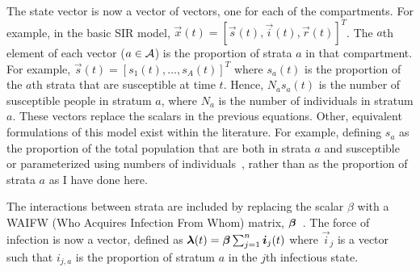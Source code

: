\documentclass[thesis.tex]{subfiles}
\begin{document}
The state vector is now a vector of vectors, one for each of the compartments.
For example, in the basic SIR model, $\vec{x}(t) = [\vec{s}(t), \vec{i}(t), \vec{r}(t)]^T$.
The $a$th element of each vector ($a \in \mathcal{A}$) is the proportion of strata $a$ in that compartment.
For example, $\vec{s}(t) = [s_1(t), \dots, s_A(t)]^T$ where $s_a(t)$ is the proportion of the $a$th strata that are susceptible at time $t$.
Hence, $N_a s_a(t)$ is the number of susceptible people in stratum $a$, where $N_a$ is the number of individuals in stratum $a$.
These vectors replace the scalars in the previous equations.
Other, equivalent formulations of this model exist within the literature.
For example, defining $s_a$ as the proportion of the total population that are both in strata $a$ and susceptible or parameterized using numbers of individuals~\autocite[57]{keelingModeling}, rather than as the proportion of strata $a$ as I have done here.

The interactions between strata are included by replacing the scalar $\beta$ with a WAIFW (Who Acquires Infection From Whom) matrix, $\bm{\beta}$~\autocite[58]{keelingModeling}.
The force of infection is now a vector, defined as $\bm{\lambda}(t) = \bm{\beta} \sum_{j=1}^n \bm{i}_j(t)$ where $\vec{i}_j$ is a vector such that $i_{j,a}$ is the proportion of stratum $a$ in the $j$th infectious state.
\end{document}
